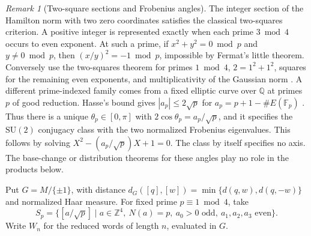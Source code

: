 \documentclass[11pt,reqno]{amsart}
\theoremstyle{definition}
\theoremstyle{remark}
\newtheorem{remark}[theorem]{Remark}
\numberwithin{equation}{section}
\newcommand{\Q}{\mathbb{Q}}
\newcommand{\Z}{\mathbb{Z}}
\newcommand{\SU}{\mathrm{SU}}
\begin{document}
\begin{remark}[Two-square sections and Frobenius angles]\label{m6:arithmetic-anchors}
The integer section of the Hamilton norm with two zero coordinates
satisfies the classical two-squares criterion. A positive integer
is represented exactly when each prime \(3\bmod 4\) occurs to even
exponent. At such a prime, if \(x^2+y^2=0\bmod p\) and \(y\ne0\bmod p\),
then \((x/y)^2=-1\bmod p\), impossible by Fermat's little theorem.
Conversely use the two-squares theorem for primes \(1\bmod4\),
\(2=1^2+1^2\), squares for the remaining even exponents, and
multiplicativity of the Gaussian norm \cite[Ch.~XX]{d4-hw}.
A different prime-indexed family comes from a fixed elliptic curve
over \(\Q\) at primes \(p\) of good reduction. Hasse's bound gives
\(|a_p|\le2\sqrt p\) for \(a_p=p+1-\#E(\mathbb F_p)\)
\cite[Ch.~V, Theorem~1.1]{m6:Silverman}. Thus there is a unique
\(\theta_p\in[0,\pi]\) with \(2\cos\theta_p=a_p/\sqrt p\),
and it specifies the \(\SU(2)\) conjugacy class with the two
normalized Frobenius eigenvalues. This follows by solving
\(X^2-(a_p/\sqrt p)X+1=0\). The class by itself specifies no axis.
The base-change or distribution theorems for these angles play
no role in the products below.
\end{remark}

Put \(G=M/\{\pm1\}\), with distance
\(d_G([q],[w])=\min\{d(q,w),d(q,-w)\}\) and normalized Haar measure.
For fixed prime \(p\equiv1\bmod4\), take
\[
 S_p=\{[a/\sqrt p]\mid a\in\Z^4,\ N(a)=p,\ 
                   a_0>0\text{ odd},\ a_1,a_2,a_3\text{ even}\}.
\]
Write \(W_n\) for the reduced words of length \(n\), evaluated in \(G\).
\end{document}
